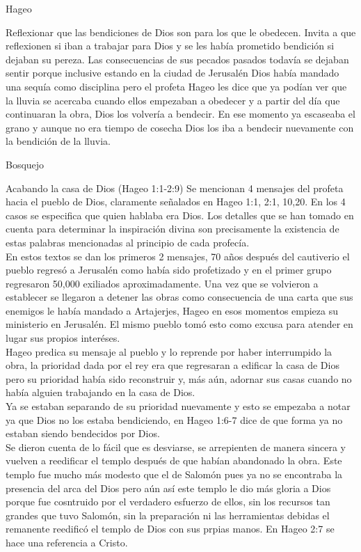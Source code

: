 \begin{section}{Hageo}
\begin{enumerate}
			Reflexionar que las bendiciones de Dios son para los que le obedecen. Invita a que reflexionen si iban a trabajar para Dios y se les había prometido bendición si dejaban su pereza. Las consecuencias de sus pecados pasados todavía se dejaban sentir porque inclusive estando en la ciudad de Jerusalén Dios había mandado una sequía como disciplina pero el profeta Hageo les dice que ya podían ver que la lluvia se acercaba cuando ellos empezaban a obedecer y a partir del día que continuaran la obra, Dios los volvería a bendecir. En ese momento ya escaseaba el grano y aunque no era tiempo de cosecha Dios los iba a bendecir nuevamente con la bendición de la lluvia.
	\end{enumerate}
	\newpage
	\begin{subsection}{Bosquejo}
		\begin{subsubsection}{Acabando la casa de Dios (Hageo 1:1-2:9)}
			Se mencionan 4 mensajes del profeta hacia el pueblo de Dios, claramente señalados en Hageo 1:1, 2:1, 10,20. En los 4 casos se especifica que quien hablaba era Dios. Los detalles que se han tomado en cuenta para determinar la inspiración divina son precisamente la existencia de estas palabras mencionadas al principio de cada profecía.\\
			En estos textos se dan los primeros 2 mensajes, 70 años después del cautiverio el pueblo regresó a Jerusalén como había sido profetizado y en el primer grupo regresaron 50,000 exiliados aproximadamente. Una vez que se volvieron a establecer se llegaron a detener las obras como consecuencia de una carta que sus enemigos le había mandado a Artajerjes, Hageo en esos momentos empieza su ministerio en Jerusalén. El mismo pueblo tomó esto como excusa para atender en lugar sus propios interéses.\\
			Hageo predica su mensaje al pueblo y lo reprende por haber interrumpido la obra, la prioridad dada por el rey era que regresaran a edificar la casa de Dios pero su prioridad había sido reconstruir y, más aún, adornar sus casas cuando no había alguien trabajando en la casa de Dios.\\
			Ya se estaban separando de su prioridad nuevamente y esto se empezaba a notar ya que Dios no los estaba bendiciendo, en Hageo 1:6-7 dice de que forma ya no estaban siendo bendecidos por Dios.\\
			Se dieron cuenta de lo fácil que es desviarse, se arrepienten de manera sincera y vuelven a reedificar el templo después de que habían abandonado la obra. Este templo fue mucho más modesto que el de Salomón pues ya no se encontraba la presencia del arca del Dios pero aún así este templo le dio más gloria a Dios porque fue cosntruido por el verdadero esfuerzo de ellos, sin los recursos tan grandes que tuvo Salomón, sin la preparación ni las herramientas debidas el remanente reedificó el templo de Dios con sus prpias manos. En Hageo 2:7 se hace una referencia a Cristo.

\end{subsubsection}
\end{subsection}
\end{section}
